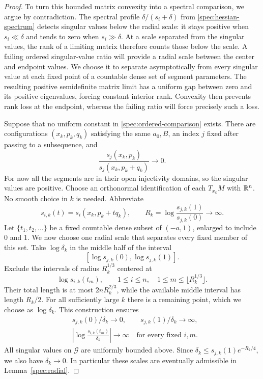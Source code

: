 \begin{proof}
To turn this bounded matrix convexity into a spectral comparison,
we argue by contradiction. The spectral profile
$\delta/(s_i+\delta)$ from \eqref{spec:hessian-spectrum}
detects singular values below the radial scale: it stays positive
when $s_i\ll\delta$ and tends to zero when $s_i\gg\delta$.
At a scale separated from the singular values, the rank of a
limiting matrix therefore counts those below the scale.
A failing ordered singular-value ratio
will provide a radial scale between the center and endpoint values.
We choose it to separate asymptotically from every singular value
at each fixed point of a countable dense set of segment parameters.
The resulting positive semidefinite
matrix limit has a uniform gap between zero and its positive
eigenvalues, forcing constant interior rank. Convexity then prevents
rank loss at the endpoint, whereas the failing ratio will force
precisely such a loss.

Suppose that no uniform constant in
\eqref{spec:ordered-comparison} exists.  There are configurations
$(x_k,p_k,q_k)$ satisfying the same $a_0,B$, an index $j$ fixed
after passing to a subsequence, and
\begin{equation}\label{spec:failed-ratio}
  \frac{s_j(x_k,p_k)}{s_j(x_k,p_k+q_k)}\longrightarrow0.
\end{equation}
For now all the segments are in their open injectivity domains,
so the singular values are positive.  Choose an orthonormal
identification of each $T_{x_k}M$ with $\mathbb R^n$.  No smooth choice
in $k$ is needed.  Abbreviate
\[
  s_{i,k}(t)=s_i(x_k,p_k+tq_k),\qquad
  R_k=\log\frac{s_{j,k}(1)}{s_{j,k}(0)}\longrightarrow\infty.
\]
Let $\{t_1,t_2,\ldots\}$ be a fixed countable dense subset of
$(-a,1)$, enlarged to include $0$ and $1$.  We now choose one
radial scale that separates every fixed member of this set.
Take $\log\delta_k$ in the middle half of the interval
\[
  [\log s_{j,k}(0),\log s_{j,k}(1)].
\]
Exclude the intervals of radius $R_k^{1/3}$ centered at
\[
  \log s_{i,k}(t_m),\qquad
  1\le i\le n,\quad 1\le m\le\lfloor R_k^{1/3}\rfloor.
\]
Their total length is at most $2nR_k^{2/3}$, while the available
middle interval has length $R_k/2$.  For all sufficiently large
$k$ there is a remaining point, which we choose as
$\log\delta_k$.  This construction ensures
\begin{align}
  &s_{j,k}(0)/\delta_k\longrightarrow0,
       \qquad s_{j,k}(1)/\delta_k\longrightarrow\infty,
       \label{spec:separating-scale}\\
  &\left|\log\frac{s_{i,k}(t_m)}{\delta_k}\right|
       \longrightarrow\infty
       \quad\text{for every fixed }i,m.
       \label{spec:dense-separation}
\end{align}
All singular values on $\mathcal G$ are uniformly bounded above.
Since $\delta_k\le s_{j,k}(1)e^{-R_k/4}$, we also have
$\delta_k\to0$.  In particular these scales are eventually
admissible in Lemma~\ref{spec:radial}.


\end{proof}
